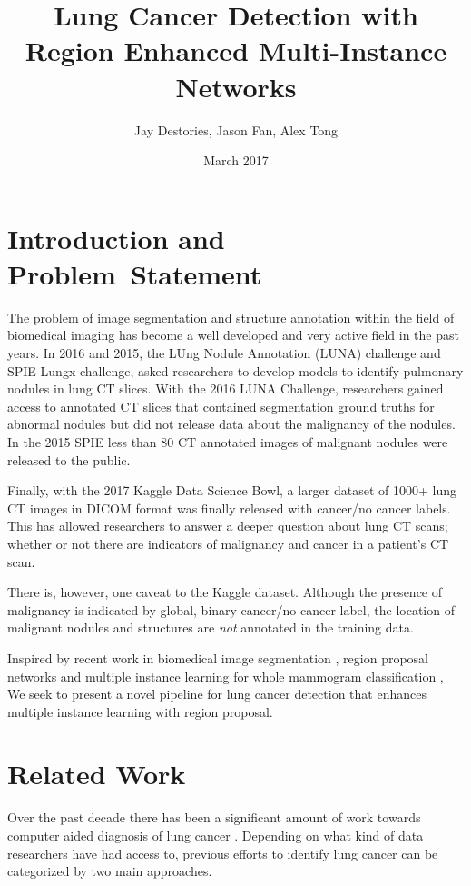 \documentclass[twocolumn,10pt]{article}
\title{Lung Cancer Detection with \\Region Enhanced 
Multi-Instance Networks}
\author{Jay Destories, Jason Fan, Alex Tong}
\date{March 2017}
\begin{document}
\maketitle
\section{Introduction and \\Problem~Statement}
The problem of image segmentation and structure annotation within the 
field of biomedical imaging has become a well developed and very active field in
the past years. In 2016 and 2015, the LUng Nodule Annotation (LUNA) challenge and 
SPIE Lungx challenge, asked researchers to develop models to identify pulmonary 
nodules in lung CT slices. With the 2016 LUNA Challenge, researchers gained access
to annotated CT slices that contained segmentation ground truths for abnormal 
nodules but did not release data about the malignancy of the nodules. 
In the 2015 SPIE less than 80 CT annotated images of malignant nodules were 
released to the public.

Finally, with the 2017 Kaggle Data Science Bowl, a larger dataset of
1000+ lung CT images in DICOM format was finally released with cancer/no cancer 
labels. This has allowed researchers to answer a deeper question about lung CT
scans; whether or not there are indicators of malignancy and cancer in a patient's
CT scan.

There is, however, one caveat to the Kaggle dataset. 
Although the presence of malignancy is indicated by global, binary 
cancer/no-cancer label, the location of malignant nodules and structures are
\textit{not} annotated in the training data.

Inspired by recent work in biomedical image segmentation
\cite{DBLP:journals/corr/ChristEETBBRAHD16}, region proposal 
networks and multiple instance learning for whole mammogram classification
\cite{Maron:1998:FML:302528.302753},
We seek to present a novel pipeline for lung cancer detection that enhances
multiple instance learning with region proposal.

\section{Related Work}

Over the past decade there has been a significant amount of work towards 
computer aided diagnosis of lung cancer \cite{cad_1998}. Depending on what kind
of data researchers have had access to, previous efforts to identify lung cancer
can be categorized by two main approaches. 
\end{document}
